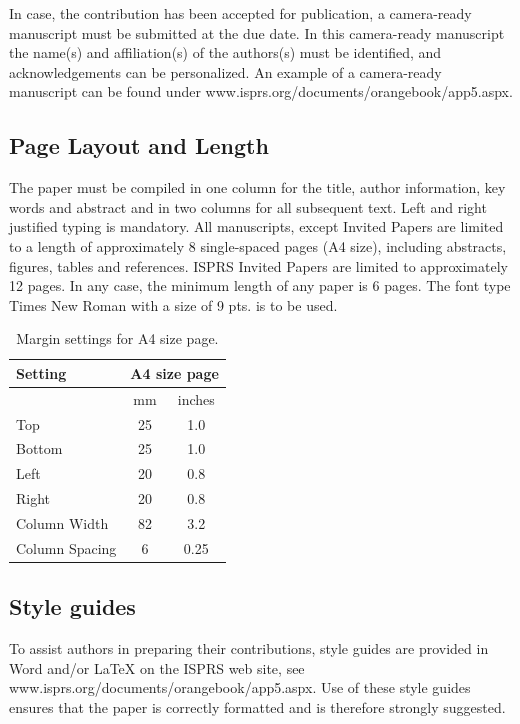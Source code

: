 \documentclass{isprs} %
\begin{document}
In case, the contribution has been accepted for publication, a camera-ready manuscript must be submitted at the due date. In this camera-ready manuscript the name(s) and affiliation(s) of the authors(s) must be identified, and acknowledgements can be personalized. An example of a camera-ready manuscript can be found under www.isprs.org/documents/orangebook/app5.aspx.

\subsection{Page Layout and Length}\label{sec:Page Layout, Spacing and Margins}
The paper must be compiled in one column for the title, author information, key words and abstract and in two columns for all subsequent text. Left and right justified typing is mandatory. All manuscripts, except Invited Papers are limited to a length of approximately 8 single-spaced pages (A4 size), including abstracts, figures, tables and references. ISPRS Invited Papers are limited to approximately 12 pages. In any case, the minimum length of any paper is 6 pages. The font type Times New Roman with a size of 9 pts. is to be used.

\begin{table}[h]
	\centering
		\begin{tabular}{|l|c|c|}\hline
			Setting&\multicolumn{2}{c|}{A4 size page}\\\hline
			  &mm&inches\\
			 Top&25&1.0\\
			 Bottom&25&1.0\\
			 Left&20&0.8\\
			 Right&20&0.8\\
			 Column Width&82&3.2\\
			 Column Spacing&6&0.25\\\hline
		\end{tabular}
	\caption{Margin settings for A4 size page.}
\label{tab:Margin_settings}
\end{table}

\subsection{Style guides}\label{sec:Preparation in electronic form}

To assist authors in preparing their contributions, style guides are provided in Word and/or LaTeX on the ISPRS web site, see www.isprs.org/documents/orangebook/app5.aspx. Use of these style guides ensures that the paper is correctly formatted and is therefore strongly suggested.
\end{document}

